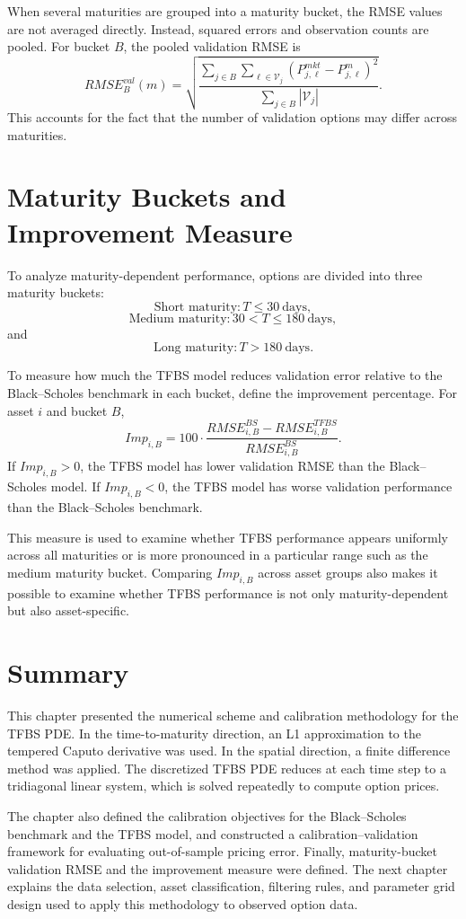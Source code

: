 \documentclass[11pt,a4paper]{report}
\begin{document}
When several maturities are grouped into a maturity bucket, the RMSE values are not averaged directly. Instead, squared errors and observation counts are pooled. For bucket $B$, the pooled validation RMSE is
\[
RMSE_{B}^{val}(m)
=
\sqrt{
\frac{
\sum_{j\in B}
\sum_{\ell\in\mathcal{V}_j}
\left(
P_{j,\ell}^{mkt}
-
P_{j,\ell}^{m}
\right)^2
}{
\sum_{j\in B}|\mathcal{V}_j|
}
}.
\]
This accounts for the fact that the number of validation options may differ across maturities.

\section{Maturity Buckets and Improvement Measure}

To analyze maturity-dependent performance, options are divided into three maturity buckets:
\[
\text{Short maturity}:
T\le 30\ \text{days},
\]
\[
\text{Medium maturity}:
30<T\le 180\ \text{days},
\]
and
\[
\text{Long maturity}:
T>180\ \text{days}.
\]

To measure how much the TFBS model reduces validation error relative to the Black--Scholes benchmark in each bucket, define the improvement percentage. For asset $i$ and bucket $B$,
\[
Imp_{i,B}
=
100
\cdot
\frac{
RMSE_{i,B}^{BS}
-
RMSE_{i,B}^{TFBS}
}{
RMSE_{i,B}^{BS}
}.
\]
If $Imp_{i,B}>0$, the TFBS model has lower validation RMSE than the Black--Scholes model. If $Imp_{i,B}<0$, the TFBS model has worse validation performance than the Black--Scholes benchmark.

This measure is used to examine whether TFBS performance appears uniformly across all maturities or is more pronounced in a particular range such as the medium maturity bucket. Comparing $Imp_{i,B}$ across asset groups also makes it possible to examine whether TFBS performance is not only maturity-dependent but also asset-specific.

\section{Summary}

This chapter presented the numerical scheme and calibration methodology for the TFBS PDE. In the time-to-maturity direction, an L1 approximation to the tempered Caputo derivative was used. In the spatial direction, a finite difference method was applied. The discretized TFBS PDE reduces at each time step to a tridiagonal linear system, which is solved repeatedly to compute option prices.

The chapter also defined the calibration objectives for the Black--Scholes benchmark and the TFBS model, and constructed a calibration--validation framework for evaluating out-of-sample pricing error. Finally, maturity-bucket validation RMSE and the improvement measure were defined. The next chapter explains the data selection, asset classification, filtering rules, and parameter grid design used to apply this methodology to observed option data.
\end{document}
